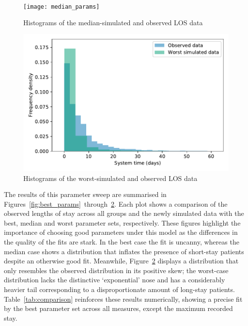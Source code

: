 \begin{figure}
    \texttt{[image: median\_params]}
    \caption{%
        Histograms of the median-simulated and observed LOS data
    }\label{fig:median_params}
\end{figure}

\begin{figure}
    \includegraphics[width=\imgwidth]{worst_params}
    \caption{%
        Histograms of the worst-simulated and observed LOS data
    }\label{fig:worst_params}
\end{figure}

The results of this parameter sweep are summarised in
Figures~\ref{fig:best_params}~through~\ref{fig:worst_params}. Each plot shows a
comparison of the observed lengths of stay across all groups and the newly
simulated data with the best, median and worst parameter sets, respectively.
These figures highlight the importance of choosing good parameters under this
model as the differences in the quality of the fits are stark. In the best case
the fit is uncanny, whereas the median case shows a distribution that inflates
the presence of short-stay patients despite an otherwise good fit. Meanwhile,
Figure~\ref{fig:worst_params} displays a distribution that only resembles the
observed distribution in its positive skew; the worst-case distribution lacks
the distinctive `exponential' nose and has a considerably heavier tail
corresponding to a disproportionate amount of long-stay patients.
Table~\ref{tab:comparison} reinforces these results numerically, showing a
precise fit by the best parameter set across all measures, except the maximum
recorded stay.

\begin{table}
    \centering
    \resizebox{\textwidth}{!}{%
        
    }
    \caption{%
        A comparison of the observed and simulated data based on the model
        parameters and summary statistics for length of stay
    }\label{tab:comparison}
\end{table}

